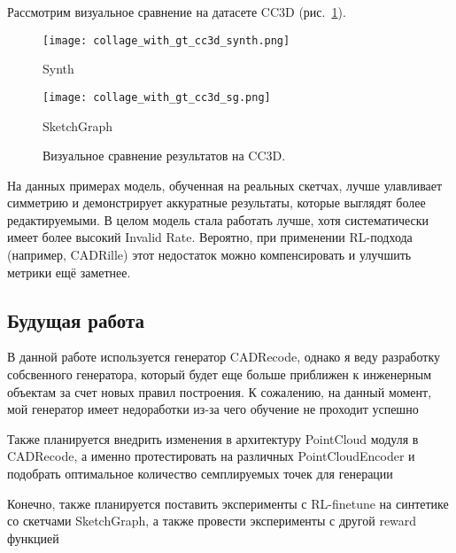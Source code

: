 Рассмотрим визуальное сравнение на датасете CC3D (рис.~\ref{fig:datasets1}).

\begin{figure}[h!]
    \centering
    \texttt{[image: collage\_with\_gt\_cc3d\_synth.png]}
    \caption*{Synth}
    \vspace{1em}
    \texttt{[image: collage\_with\_gt\_cc3d\_sg.png]}
    \caption*{SketchGraph}
    \caption{Визуальное сравнение результатов на CC3D.}
    \label{fig:datasets1}
\end{figure}

На данных примерах модель, обученная на реальных скетчах, лучше улавливает симметрию и демонстрирует аккуратные результаты, которые выглядят более редактируемыми.
В целом модель стала работать лучше, хотя систематически имеет более высокий Invalid Rate.
Вероятно, при применении RL-подхода (например, CADRille) этот недостаток можно компенсировать и улучшить метрики ещё заметнее.

\subsection{Будущая работа}

В данной работе используется генератор CADRecode, однако я веду разработку собсвенного генератора, который будет еще больше приближен к инженерным объектам за счет новых правил построения.
К сожалению, на данный момент, мой генератор имеет недоработки из-за чего обучение не проходит успешно

Также планируется внедрить изменения в архитектуру PointCloud модуля в CADRecode, а именно протестировать на различных PointCloudEncoder и подобрать оптимальное количество семплируемых точек для генерации

Конечно, также планируется поставить эксперименты с RL-finetune на синтетике со скетчами SketchGraph, а также провести эксперименты с другой reward функцией

\newpage
